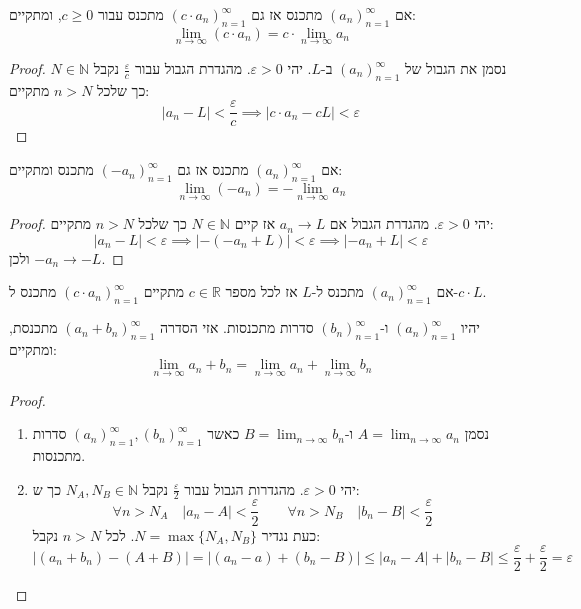 \documentclass{tstextbook}
\begin{document}
\begin{proposition}
אם \((a_n)_{n=1}^\infty\) מתכנס אז גם \(\left( c\cdot a_n \right)_{n=1}^\infty\) מתכנס עבור \(c\geq 0\), ומתקיים:
$$\lim_{ n \to \infty } \left( c\cdot a_{n} \right)=c\cdot\lim_{ n \to \infty } a_{n}$$

\end{proposition}
\begin{proof}
נסמן את הגבול של \((a_n)_{n=1}^\infty\) ב-\(L\).
יהי \(\varepsilon>0\). מהגדרת הגבול עבור \(\frac{\varepsilon}{c}\) נקבל \(N \in \mathbb{N}\) כך שלכל \(n>N\) מתקיים:
$$|a_{n}-L|<\frac{\varepsilon}{c}\implies |c\cdot a_{n}-cL|<\varepsilon$$

\end{proof}
\begin{proposition}
אם \((a_n)_{n=1}^\infty\) מתכנס אז גם \((-a_n)_{n=1}^\infty\) מתכנס ומתקיים:
$$\lim_{ n \to \infty } (-a_{n})=-\lim_{ n \to \infty }a_{n} $$

\end{proposition}
\begin{proof}
יהי \(\varepsilon>0\). מהגדרת הגבול אם \(a_{n}\to L\) אז קיים \(N\in \mathbb{N}\) כך שלכל \(n>N\) מתקיים:
$$\lvert a_{n}-L \rvert <\varepsilon\implies \lvert -(-a_{n}+L) \rvert <\varepsilon\implies \lvert -a_{n}+L \rvert <\varepsilon$$
ולכן \(-a_{n}\to -L\).

\end{proof}
\begin{corollary}
אם \((a_n)_{n=1}^\infty\) מתכנס ל-\(L\) אז לכל מספר \(c \in \mathbb{R}\) מתקיים \(\left( c\cdot a_n \right)_{n=1}^\infty\) מתכנס ל-\(c\cdot L\).

\end{corollary}
\begin{theorem}
יהיו \((a_n)_{n=1}^\infty\) ו-\((b_n)_{n=1}^\infty\) סדרות מתכנסות. אזי הסדרה \((a_n+b_{n})_{n=1}^\infty\) מתכנסת, ומתקיים:
$$\lim_{ n \to \infty } a_{n}+b_{n}=\lim_{ n \to \infty } a_{n}+\lim_{ n \to \infty }b_{n} $$

\end{theorem}
\begin{proof}
  \begin{enumerate}
    \item נסמן \(A=\lim_{ n \to \infty }a_{n}\) ו-\(B=\lim_{ n \to \infty }b_{n}\) כאשר \((a_n)_{n=1}^\infty,(b_n)_{n=1}^\infty\) סדרות מתכנסות. 


    \item יהי \(\varepsilon>0\). מהגדרות הגבול עבור \(\frac{\varepsilon}{2}\) נקבל \(N_{A},N_{B}\in \mathbb{N}\) כך ש: 
$$\forall n>N_{A}\quad |a_{n}-A|<\frac{\varepsilon}{2}\qquad \forall n > N_{B}\quad |b_{n}-B|<\frac{\varepsilon}{2}$$
כעת נגדיר \(N=\max\{ N_{A},N_{B} \}\). לכל \(n>N\) נקבל:
$$\lvert (a_{n}+b_{n})-(A+B) \rvert =\lvert (a_{n}-a)+(b_{n}-B) \rvert \leq \lvert a_{n}-A \rvert +\lvert b_{n}-B \rvert \leq \frac{\varepsilon}{2}+\frac{\varepsilon}{2}=\varepsilon$$


  \end{enumerate}
\end{proof}
\end{document}

